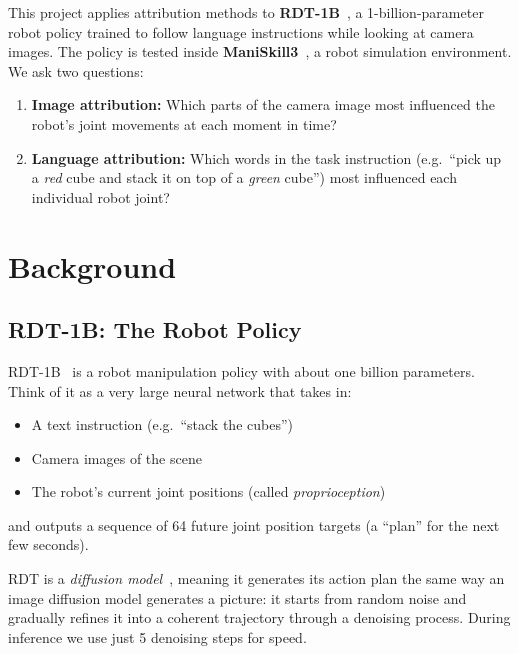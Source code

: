 \documentclass[11pt,a4paper]{article}
\begin{document}
This project applies attribution methods to \textbf{RDT-1B}~\cite{Liu2024RDT1B},
a 1-billion-parameter robot policy trained to follow language instructions while
looking at camera images. The policy is tested inside \textbf{ManiSkill3}~\cite{Chen2024ManiSkill3},
a robot simulation environment. We ask two questions:

\begin{enumerate}
    \item \textbf{Image attribution:} Which parts of the camera image most
          influenced the robot's joint movements at each moment in time?
    \item \textbf{Language attribution:} Which words in the task instruction
          (e.g.\ ``pick up a \emph{red} cube and stack it on top of a
          \emph{green} cube'') most influenced each individual robot joint?
\end{enumerate}

\section{Background}

\subsection{RDT-1B: The Robot Policy}

RDT-1B~\cite{Liu2024RDT1B} is a robot manipulation policy with about one billion
parameters. Think of it as a very large neural network that takes in:
\begin{itemize}
    \item A text instruction (e.g.\ ``stack the cubes'')
    \item Camera images of the scene
    \item The robot's current joint positions (called \emph{proprioception})
\end{itemize}
and outputs a sequence of 64 future joint position targets (a ``plan'' for
the next few seconds).

RDT is a \emph{diffusion model}~\cite{Ho2020DDPM,Chi2023DiffusionPolicy},
meaning it generates its action plan the same way an image diffusion model
generates a picture: it starts from random noise and gradually refines it
into a coherent trajectory through a denoising process. During inference
we use just 5 denoising steps for speed.
\end{document}
